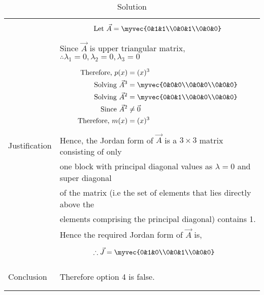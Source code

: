 \begin{longtable}{|l|l|}
&\parbox{6cm}{\begin{align*}
    \mbox{Let }\vec{A}&=\myvec{0&1&1\\0&0&1\\0&0&0}\\
\end{align*}}\\
&Since $\vec{A}$ is upper triangular matrix, $\therefore \lambda_{1}=0,\lambda_{2}=0,\lambda_{3}=0$ \\
&\parbox{6cm}{\begin{align*}
    \mbox{Therefore, }p(x)&=(x)^3\\
    \mbox{Solving }\vec{A}^3&=\myvec{0&0&0\\0&0&0\\0&0&0}\\
    \mbox{Solving }\vec{A}^2&=\myvec{0&0&1\\0&0&0\\0&0&0}\\
    \mbox{Since }\vec{A}^2&\neq \vec{0}\\
    \mbox{Therefore, }m(x)&=(x)^3\\
    \end{align*}}\\
Justification&Hence, the Jordan form of $\vec{A}$ is a $3 \times 3$ matrix consisting of only\\
&one block with principal diagonal values as $\lambda = 0$ and super diagonal\\
&of the matrix (i.e the set of elements that lies directly above the\\
&elements comprising the principal diagonal) contains 1.\\
&Hence the required Jordan form of $\vec{A}$ is,\\
&\parbox{6cm}{\begin{align*}
    \therefore \vec{J}&=\myvec{0&1&0\\0&0&1\\0&0&0}
\end{align*}}\\
&\\
\hline
&\\
Conclusion&Therefore option 4 is false.\\
&\\
\hline
\caption{Solution}
\label{eq:solutions/2014/dec/71/table:2}
\end{longtable}
